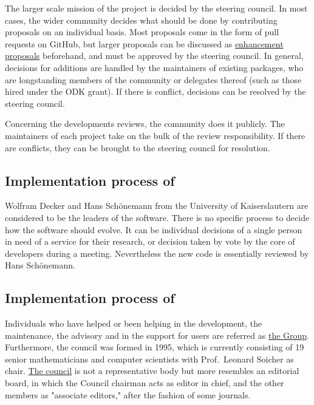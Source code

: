 \documentclass{deliverablereport}
\begin{document}
The larger scale mission of the project is decided by the steering council. In most cases, the wider \Jupyter community decides what should be done by contributing proposals on an individual basis. Most proposals come in the form of pull requests on GitHub, but larger proposals can be discussed as \href{https://github.com/jupyter/enhancement-proposals}{enhancement proposals} beforehand, and must be approved by the steering council. In general, decisions for additions are handled by the maintainers of existing packages, who are longstanding members of the community or delegates thereof (such as those hired under the ODK grant). If there is conflict, decisions can be resolved by the steering council.

Concerning the developments reviews, the \Jupyter community does it publicly. The maintainers of each project take on the bulk of the review responsibility. If there are conflicts, they can be brought to the steering council for resolution.


\subsection{Implementation process of \Singular}

Wolfram Decker and Hans Schönemann from the University of Kaiserslautern are considered to be the leaders of the \Singular software.
There is no specific process to decide how the software should evolve. It can be individual decisions of a single person in need of a service for their research, or decision taken by vote by the core of \Singular developers during a meeting.
Nevertheless the new code is essentially reviewed by Hans Schönemann.

\subsection{Implementation process of \GAP}

Individuals who have helped or been helping in the development, the
maintenance, the advisory and in the support for users are referred as
\href{https://www.gap-system.org/Contacts/People/people.html}{the \GAP
  Group}.  Furthermore, the \GAP council was formed in 1995, which is
currently consisting of 19 senior mathematicians and computer
scientists with Prof.~Leonard Soicher as
chair. \href{https://www.gap-system.org/Contacts/People/Council/council.html}{The
  \GAP council} is not a representative body but more resembles an
editorial board, in which the Council chairman acts as editor in
chief, and the other members as "associate editors," after
the fashion of some journals.
\end{document}
